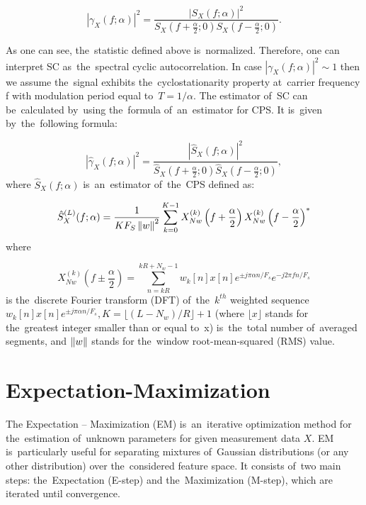 \begin{equation}
\label{eq:SC}
\left|\gamma_X(f;\alpha)\right|^{2}=\frac { \left|S_X(f;\alpha)\right|^2 }{ S_X(f+\frac{\alpha}{2};0)S_X(f-\frac{\alpha}{2};0)}.
\end{equation}

As one can see, the~statistic defined above is~normalized. Therefore, one can interpret SC as~the~spectral cyclic autocorrelation. In case $\left|\gamma_X(f;\alpha)\right|^{2}\sim 1$ then we assume the~signal exhibits the~cyclostationarity property at~carrier frequency f with modulation period equal to~$T=1/\alpha$.
The estimator of~SC can be~calculated by~using the~formula of~an~estimator for CPS. It is~given by~the~following formula:

\begin{equation}
\left|\hat{\gamma}_X(f;\alpha)\right|^{2}=\frac{ \left|\hat{S}_X(f;\alpha)\right|^2 
}{\hat{S}_X(f+\frac{\alpha}{2};0)\hat{S}_X(f-\frac{\alpha}{2};0)},
\end{equation} 
where $\hat{S}_X(f;\alpha)$ is~an~estimator of~the~CPS defined as:

\begin{equation}
\hat{S}_X^{(L)}(f;\alpha)=\frac{1}{KF_S\left\lVert w\right\rVert^2}\sum_{k=0}^{K-1}X^{(k)}_{Nw}\left( f+\frac{\alpha}{2}\right)X^{(k)}_{Nw}\left( f-\frac{\alpha}{2}\right)^{*}
\end{equation} 
where

\begin{equation}
X^{(k)}_{Nw}\left( f\pm\frac{\alpha}{2}\right)=\sum_{n=kR}^{kR+N_w-1}w_k[n]x[n]e^{\pm j\pi\alpha n/F_s}e^{-j2\pi fn/F_s}
\end{equation} 
is the~discrete Fourier transform (DFT) of~the~$k^{th}$ weighted sequence $w_k[n]x[n]e^{\pm j\pi\alpha n/F_s}, K=\lfloor (L-N_w)/R\rfloor+1$ (where $\lfloor x \rfloor$ stands for the~greatest integer smaller than or equal to~x) is~the~total number of~averaged segments, and $\left\lVert w\right\rVert$ stands for the~window root-mean-squared (RMS) value. 


\section{Expectation-Maximization}\label{EM}

The Expectation – Maximization (EM) is~an~iterative optimization method for the~estimation of~unknown parameters for given measurement data $X$. EM is~particularly useful for separating mixtures of~Gaussian distributions (or any other distribution) over the~considered feature space. It consists of~two main steps: the~Expectation (E-step) and the~Maximization (M-step), which are iterated until convergence. 

